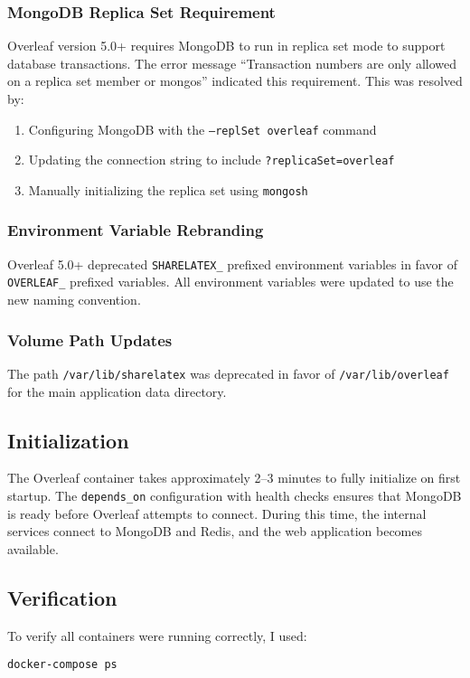 \subsubsection{MongoDB Replica Set Requirement}
Overleaf version 5.0+ requires MongoDB to run in replica set mode to support database transactions. The error message ``Transaction numbers are only allowed on a replica set member or mongos'' indicated this requirement. This was resolved by:
\begin{enumerate}
    \item Configuring MongoDB with the \texttt{--replSet overleaf} command
    \item Updating the connection string to include \texttt{?replicaSet=overleaf}
    \item Manually initializing the replica set using \texttt{mongosh}
\end{enumerate}

\subsubsection{Environment Variable Rebranding}
Overleaf 5.0+ deprecated \texttt{SHARELATEX\_} prefixed environment variables in favor of \texttt{OVERLEAF\_} prefixed variables. All environment variables were updated to use the new naming convention.

\subsubsection{Volume Path Updates}
The path \texttt{/var/lib/sharelatex} was deprecated in favor of \texttt{/var/lib/overleaf} for the main application data directory.

\subsection{Initialization}
The Overleaf container takes approximately 2--3 minutes to fully initialize on first startup. The \texttt{depends\_on} configuration with health checks ensures that MongoDB is ready before Overleaf attempts to connect. During this time, the internal services connect to MongoDB and Redis, and the web application becomes available.

\subsection{Verification}
To verify all containers were running correctly, I used:
\begin{verbatim}
docker-compose ps
\end{verbatim}

